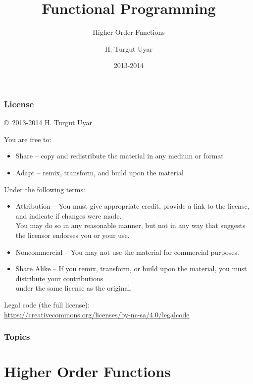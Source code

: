 \documentclass[dvipsnames]{beamer}
\title{Functional Programming}
\subtitle{Higher Order Functions}
\author{H. Turgut Uyar}
\date{2013-2014}
\theoremstyle{plain}
\begin{document}

\begin{frame}
  \titlepage
\end{frame}

\begin{frame}
  \frametitle{License}

  \hfill
  \copyright~2013-2014 H. Turgut Uyar

  \vfill
  \begin{tiny}
    You are free to:
    \begin{itemize}
      \item Share -- copy and redistribute the material in any medium or format
      \item Adapt -- remix, transform, and build upon the material
    \end{itemize}

    Under the following terms:
    \begin{itemize}
      \item Attribution -- You must give appropriate credit, provide a link to
        the license, and indicate if changes were made.\\
        You may do so in any reasonable manner, but not in any way
        that suggests the licensor endorses you or your use.

      \item Noncommercial -- You may not use the material for commercial
        purposes.

      \item Share Alike -- If you remix, transform, or build upon the material,
        you must distribute your contributions\\
        under the same license as the original.
    \end{itemize}
  \end{tiny}

  \vfill
  \begin{small}
    Legal code (the full license):\\
    \url{https://creativecommons.org/licenses/by-nc-sa/4.0/legalcode}
  \end{small}
\end{frame}

\begin{frame}
  \frametitle{Topics}
  \tableofcontents
\end{frame}

\section{Higher Order Functions}
\end{document}
